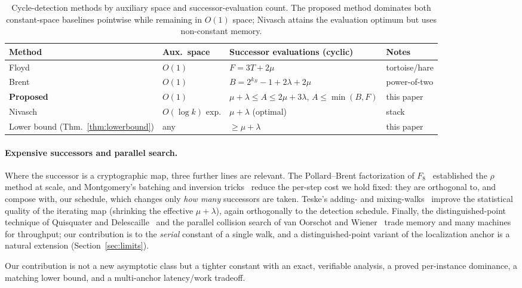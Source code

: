 \documentclass[11pt]{article}
\begin{document}
\begin{table}[H]\centering
\caption{Cycle-detection methods by auxiliary space and successor-evaluation
count. The proposed method dominates both constant-space baselines pointwise
while remaining in $O(1)$ space; Nivasch attains the evaluation optimum but uses
non-constant memory.}
\label{tab:related}
\begin{tabular}{llll}
\toprule
Method & Aux.\ space & Successor evaluations (cyclic) & Notes\\
\midrule
Floyd~\cite{floyd1967} & $O(1)$ & $F=3T+2\mu$ & tortoise/hare\\
Brent~\cite{brent1980} & $O(1)$ & $B=2^{k_B}\!-\!1+2\lambda+2\mu$ & power-of-two\\
\textbf{Proposed} & $O(1)$ & $\mu+\lambda\le A\le 2\mu+3\lambda$, $A\le\min(B,F)$ & this paper\\
Nivasch~\cite{nivasch2004} & $O(\log k)$ exp. & $\mu+\lambda$ (optimal) & stack\\
\midrule
Lower bound (Thm.~\ref{thm:lowerbound}) & any & $\ge\mu+\lambda$ & this paper\\
\bottomrule
\end{tabular}
\end{table}

\paragraph{Expensive successors and parallel search.}
Where the successor is a cryptographic map, three further lines are relevant. The
Pollard--Brent factorization of $F_8$~\cite{brent1981} established the $\rho$
method at scale, and Montgomery's batching and inversion
tricks~\cite{montgomery1987} reduce the per-step cost we hold fixed: they are
orthogonal to, and compose with, our schedule, which changes only \emph{how many}
successors are taken. Teske's adding- and mixing-walks~\cite{teske1998} improve
the statistical quality of the iterating map (shrinking the effective
$\mu+\lambda$), again orthogonally to the detection schedule. Finally, the
distinguished-point technique of Quisquater and Delescaille~\cite{qd1990} and the
parallel collision search of van Oorschot and Wiener~\cite{vow1999} trade memory
and many machines for throughput; our contribution is to the \emph{serial}
constant of a single walk, and a distinguished-point variant of the localization
anchor is a natural extension (Section~\ref{sec:limits}).

Our contribution is not a new asymptotic class but a tighter constant with an
exact, verifiable analysis, a proved per-instance dominance, a matching lower
bound, and a multi-anchor latency/work tradeoff.
\end{document}

